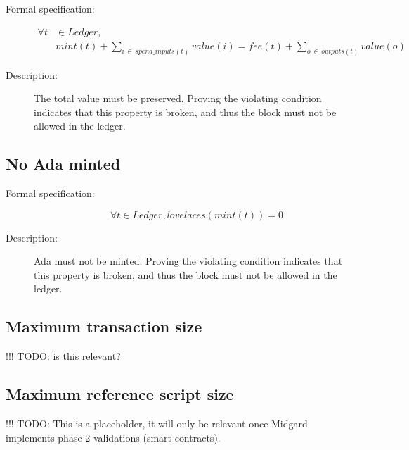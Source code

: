 \documentclass[../midgard.tex]{subfiles}
\begin{document}
\begin{description}

\item[Formal specification:]
\begin{equation*}
\begin{split}
    \forall t & \in Ledger, \\
    & mint(t) + \sum_{i \, \in \, spend\_inputs(t)} value(i) = fee(t) + \sum_{o \, \in \, outputs(t)} value(o)
\end{split}
\end{equation*}
        
\item[Description:] The total value must be preserved.
  Proving the violating condition indicates that this property is broken, and thus the block must not be allowed in the ledger.

\end{description}


\subsection{No Ada minted}

\begin{description}

\item[Formal specification:]
\begin{equation*}
    \forall t \in Ledger, lovelaces(mint(t)) = 0
\end{equation*}
            
\item[Description:] Ada must not be minted.
  Proving the violating condition indicates that this property is broken, and thus the block must not be allowed in the ledger.
    
\end{description}

\subsection{Maximum transaction size}

!!! TODO: is this relevant?

\subsection{Maximum reference script size}

!!! TODO: This is a placeholder, it will only be relevant once Midgard implements phase 2 validations (smart contracts).
\end{document}
